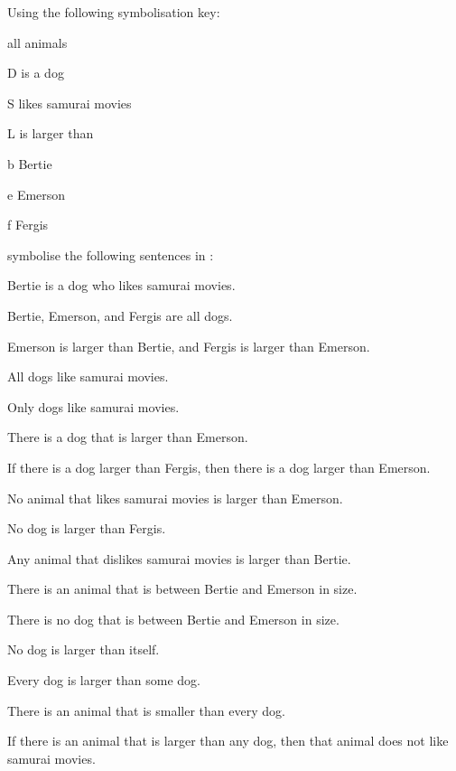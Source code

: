 \problempart 
Using the following symbolisation key:
\begin{ekey}
\item[\text{domain}] all animals
\item[D\meta{x}]  is a dog
\item[S\meta{x}]  likes samurai movies
\item[L\meta{xy}]  is larger than 
\item[b] Bertie
\item[e] Emerson
\item[f] Fergis
\end{ekey}
symbolise the following sentences in \FOL:
\begin{earg}
\item Bertie is a dog who likes samurai movies.
\item Bertie, Emerson, and Fergis are all dogs.
\item Emerson is larger than Bertie, and Fergis is larger than Emerson.
\item All dogs like samurai movies.
\item Only dogs like samurai movies.
\item There is a dog that is larger than Emerson.
\item If there is a dog larger than Fergis, then there is a dog larger than Emerson.
\item No animal that likes samurai movies is larger than Emerson.
\item No dog is larger than Fergis.
\item Any animal that dislikes samurai movies is larger than Bertie.
\item There is an animal that is between Bertie and Emerson in size.
\item There is no dog that is between Bertie and Emerson in size.
\item No dog is larger than itself.
\item Every dog is larger than some dog.
\item There is an animal that is smaller than every dog.
\item If there is an animal that is larger than any dog, then that animal does not like samurai movies.
\end{earg}

